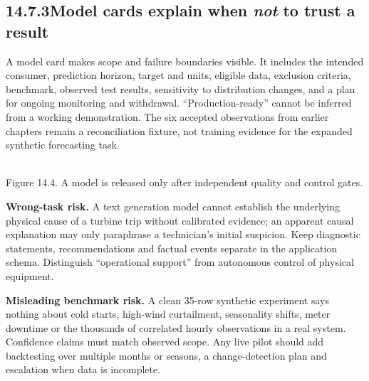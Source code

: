 \documentclass[11pt,twoside]{article}
\newcommand{\topic}[2]{\subsection*{#1\quad #2}}
\begin{document}
\newpage

\topic{14.7.3}{Model cards explain when \emph{not} to trust a result}
A model card makes scope and failure boundaries visible. It includes the intended consumer, prediction horizon, target and units, eligible data, exclusion criteria, benchmark, observed test results, sensitivity to distribution changes, and a plan for ongoing monitoring and withdrawal. ``Production-ready'' cannot be inferred from a working demonstration. The six accepted observations from earlier chapters remain a reconciliation fixture, not training evidence for the expanded synthetic forecasting task.
\begin{center}\\{\fontsize{8}{9}\selectfont\color{inkgray}Figure 14.4. A model is released only after independent quality and control gates.}\end{center}
\textbf{Wrong-task risk.} A text generation model cannot establish the underlying physical cause of a turbine trip without calibrated evidence; an apparent causal explanation may only paraphrase a technician's initial suspicion. Keep diagnostic statements, recommendations and factual events separate in the application schema. Distinguish ``operational support'' from autonomous control of physical equipment.

\textbf{Misleading benchmark risk.} A clean 35-row synthetic experiment says nothing about cold starts, high-wind curtailment, seasonality shifts, meter downtime or the thousands of correlated hourly observations in a real system. Confidence claims must match observed scope. Any live pilot should add backtesting over multiple months or seasons, a change-detection plan and escalation when data is incomplete.
\end{document}
